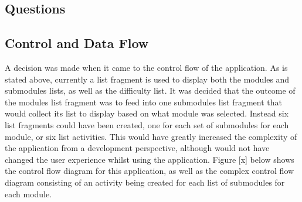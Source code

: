\documentclass{article}
\begin{document}
%
%

\subsection{Questions}

%
%

\subsection{Control and Data Flow}

A decision was made when it came to the control flow of the application. As is stated above, currently a list fragment is used to display both the modules and submodules lists, as well as the difficulty list. It was decided that the outcome of the modules list fragment was to feed into one submodules list fragment that would collect its list to display based on what module was selected. Instead six list fragments could have been created, one for each set of submodules for each module, or six list activities. This would have greatly increased the complexity of the application from a development perspective, although would not have changed the user experience whilst using the application. Figure [x] below shows the control flow diagram for this application, as well as the complex control flow diagram consisting of an activity being created for each list of submodules for each module.
\end{document}
